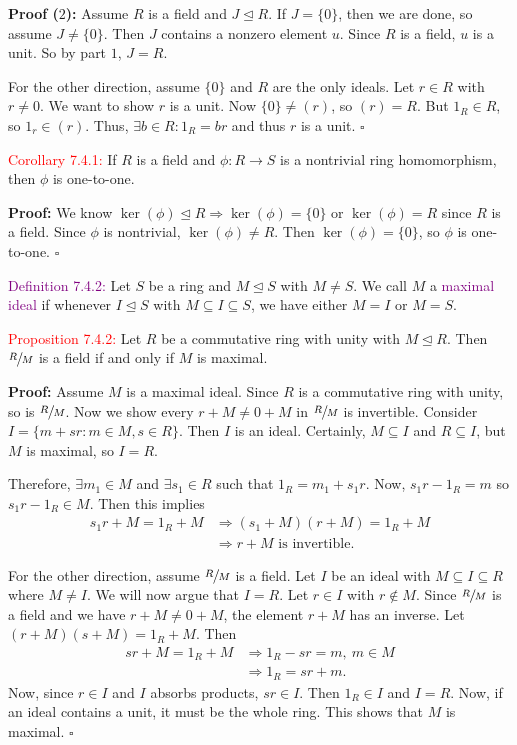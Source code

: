\documentclass{article}
\begin{document}
\textbf{Proof ($2$):} Assume $R$ is a field and $J \trianglelefteq R$. If $J = \{0\}$, then we are done, so assume $J \neq \{0\}$. Then 
$J$ contains a nonzero element $u$. Since $R$ is a field, $u$ is a unit. So by part $1$, $J = R$.

For the other direction, assume $\{0\}$ and $R$ are the only ideals. Let $r \in R$ with $r \neq 0$. We want to show $r$ is a unit. Now 
$\{0\} \neq (r)$, so $(r) = R$. But $1_R \in R$, so $1_r \in (r)$. Thus, $\exists b \in R: 1_R = br$ and thus $r$ is a unit. $\square$

\textcolor{red}{Corollary 7.4.1:} If $R$ is a field and $\phi:R \longrightarrow S$ is a nontrivial ring homomorphism, then $\phi$ is 
one-to-one.

\textbf{Proof:} We know $\ker{(\phi)} \trianglelefteq R \Longrightarrow \ker{(\phi)} = \{0\}$ or $\ker{(\phi)}=R$ since $R$ is a field. 
Since $\phi$ is nontrivial, $\ker{(\phi)} \neq R$. Then $\ker{(\phi)} = \{0\}$, so $\phi$ is one-to-one. $\square$

\textcolor{purple}{Definition 7.4.2:} Let $S$ be a ring and $M \trianglelefteq S$ with $M \neq S$. We call $M$ a \textcolor{purple}{maximal 
ideal} if whenever $I \trianglelefteq S$ with $M \subseteq I \subseteq S$, we have either $M = I$ or $M = S$.

\textcolor{red}{Proposition 7.4.2:} Let $R$ be a commutative ring with unity with $M \trianglelefteq R$. Then $\sfrac{R}{M}$ is a field if 
and only if $M$ is maximal.

\textbf{Proof:} Assume $M$ is a maximal ideal. Since $R$ is a commutative ring with unity, so is $\sfrac{R}{M}$. Now we show every 
$r+M \neq 0+M$ in $\sfrac{R}{M}$ is invertible. Consider $I= \{m+sr:m \in M, s \in R\}$. Then $I$ is an ideal. Certainly, $M \subseteq I$ 
and $R \subseteq I$, but $M$ is maximal, so $I=R$.

Therefore, $\exists m_1 \in M$ and $\exists s_1 \in R$ such that $1_R=m_1+s_1r$. Now, $s_1r-1_R = m$ so $s_1r-1_R \in M$. Then this implies
\begin{align*}
    s_1r+M = 1_R+M &\Longrightarrow (s_1+M)(r+M)=1_R+M \\
    &\Longrightarrow r+M \text{ is invertible.}
\end{align*}

For the other direction, assume $\sfrac{R}{M}$ is a field. Let $I$ be an ideal with $M \subseteq I \subseteq R$ where $M \neq I$. We will 
now argue that $I = R$. Let $r \in I$ with $r \notin M$. Since $\sfrac{R}{M}$ is a field and we have $r +M \neq 0+M$, the element $r+M$ has 
an inverse. Let $(r+M)(s+M)=1_R+M$. Then
\begin{align*}
    sr+M = 1_R+M &\Longrightarrow 1_R-sr=m, \ m \in M \\
    &\Longrightarrow 1_R = sr+m.
\end{align*}
Now, since $r \in I$ and $I$ absorbs products, $sr \in I$. Then $1_R \in I$ and $I=R$. Now, if an ideal contains a unit, it must be the 
whole ring. This shows that $M$ is maximal. $\square$
\end{document}
